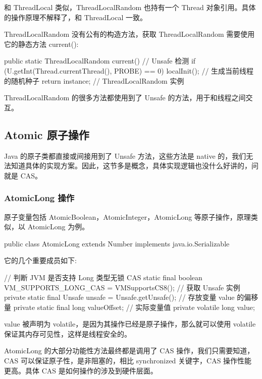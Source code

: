 和 ThreadLocal 类似，ThreadLocalRandom 也持有一个 Thread 对象引用。具体的操作原理不解释了，和 ThreadLocal 一致。

ThreadLocalRandom 没有公有的构造方法，获取 ThreadLocalRandom 需要使用它的静态方法 current():

\begin{Java}
public static ThreadLocalRandom current() {
    // Unsafe 检测
    if (U.getInt(Thread.currentThread(), PROBE) == 0)
        localInit();    // 生成当前线程的随机种子
    return instance;    // ThreadLocalRandom 实例
}
\end{Java}

ThreadLocalRandom 的很多方法都使用到了 Unsafe 的方法，用于和线程之间交互。

\subsection{Atomic 原子操作}

Java 的原子类都直接或间接用到了 Unsafe 方法，这些方法是 native 的，我们无法知道具体的实现方案。因此，这节多是概念，具体实现逻辑也没什么好讲的，问就是 CAS。

\subsubsection{AtomicLong 操作}

原子变量包括 AtomicBoolean，AtomicInteger，AtomicLong 等原子操作，原理类似，以 AtomicLong 为例。

\begin{Java}
public class AtomicLong extends Number implements java.io.Serializable
\end{Java}

它的几个重要成员如下:

\begin{Java}
// 判断 JVM 是否支持 Long 类型无锁 CAS
static final boolean VM_SUPPORTS_LONG_CAS = VMSupportsCS8();
// 获取 Unsafe 实例
private static final Unsafe unsafe = Unsafe.getUnsafe();
// 存放变量 value 的偏移量
private static final long valueOffset;
// 实际变量值
private volatile long value;
\end{Java}

value 被声明为 volatile，是因为其操作已经是原子操作，那么就可以使用 volatile 保证其内存可见性，这样是线程安全的。

AtomicLong 的大部分功能性方法最终都是调用了 CAS 操作，我们只需要知道，CAS 可以保证原子性，是非阻塞的，相比 synchronized 关键字，CAS 操作性能更高。具体 CAS 是如何操作的涉及到硬件层面。

